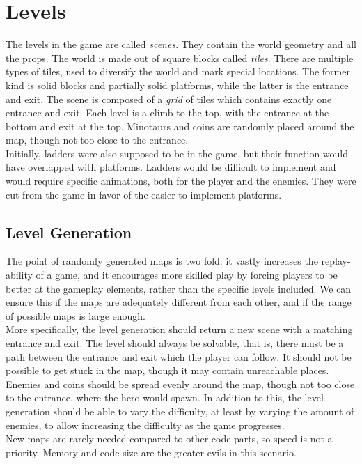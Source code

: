 \section{Levels} %
The levels in the game are called \emph{scenes}. They contain the world geometry and all the props. The world is made out of square blocks called \emph{tiles}. There are multiple types of tiles, used to diversify the world and mark special locations. The former kind is solid blocks and partially solid platforms, while the latter is the entrance and exit. The scene is composed of a \emph{grid} of tiles which contains exactly one entrance and exit. Each level is a climb to the top, with the entrance at the bottom and exit at the top. Minotaurs and coins are randomly placed around the map, though not too close to the entrance.\\
Initially, ladders were also supposed to be in the game, but their function would have overlapped with platforms. Ladders would be difficult to implement and would require specific animations, both for the player and the enemies. They were cut from the game in favor of the easier to implement platforms.

\subsection{Level Generation} %
The point of randomly generated maps is two fold: it vastly increases the replay-ability of a game, and it encourages more skilled play by forcing players to be better at the gameplay elements, rather than the specific levels included. We can ensure this if the maps are adequately different from each other, and if the range of possible maps is large enough.\\ %
More specifically, the level generation should return a new scene with a matching entrance and exit. The level should always be solvable, that is, there must be a path between the entrance and exit which the player can follow. It should not be possible to get stuck in the map, though it may contain unreachable places. Enemies and coins should be spread evenly around the map, though not too close to the entrance, where the hero would spawn. In addition to this, the level generation should be able to vary the difficulty, at least by varying the amount of enemies, to allow increasing the difficulty as the game progresses.\\ %
New maps are rarely needed compared to other code parts, so speed is not a priority. Memory and code size are the greater evils in this scenario.

